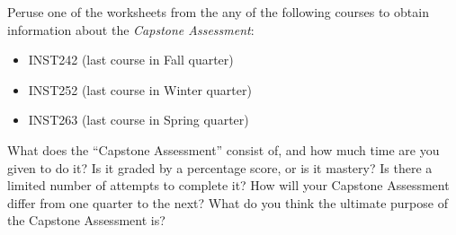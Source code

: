 

Peruse one of the worksheets from the any of the following courses to obtain information about the {\it Capstone Assessment}:

\begin{itemize}
\item{} INST242 (last course in Fall quarter)
\item{} INST252 (last course in Winter quarter)
\item{} INST263 (last course in Spring quarter)
\end{itemize}

What does the ``Capstone Assessment'' consist of, and how much time are you given to do it?  Is it graded by a percentage score, or is it mastery?  Is there a limited number of attempts to complete it?  How will your Capstone Assessment differ from one quarter to the next?  What do you think the ultimate purpose of the Capstone Assessment is?


















